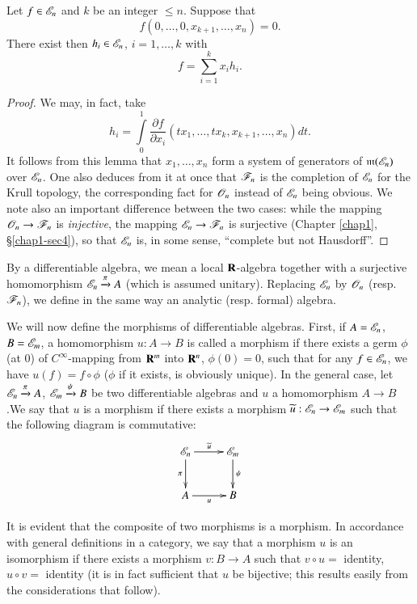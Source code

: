 \begin{lemma}\label{chap3-lem2.1}
Let $f\in \mathscr{E}_{n}$ and $k$ be an integer $\leq n$. Suppose that 
$$
f(0,\ldots,0,x_{k+1},\ldots,x_{n})=0.
$$
There exist then $h_{i}\in \mathscr{E}_{n}$, $i=1,\ldots,k$ with
$$
f=\sum\limits^{k}_{i=1}x_{i}h_{i}.
$$
\end{lemma}

\begin{proof}
We may, in fact, take
$$
h_{i}=\int\limits^{1}_{0}\dfrac{\partial f}{\partial x_{i}}(tx_{1},\ldots,tx_{k},x_{k+1},\ldots,x_{n})dt.
$$
It follows from this lemma that $x_{1},\ldots,x_{n}$ form a system of generators of $\mathfrak{m}(\mathscr{E}_{n})$ over $\mathscr{E}_{n}$. One also deduces from it at once that $\mathscr{F}_{n}$ is the completion of $\mathscr{E}_{n}$ for the Krull topology, the corresponding fact for $\mathscr{O}_{n}$ instead of $\mathscr{E}_{n}$ being obvious. We note also an important difference between the two cases: while the mapping $\mathscr{O}_{n}\to \mathscr{F}_{n}$ is {\em injective}, the mapping $\mathscr{E}_{n}\to \mathscr{F}_{n}$ is surjective (Chapter \ref{chap1}, \S\ref{chap1-sec4}), so that $\mathscr{E}_{n}$ is, in some sense, ``complete but not Hausdorff''.
\end{proof}

\begin{definition}\label{chap3-defi2.2}
By a differentiable algebra, we mean a local $\mathbf{R}$-algebra together with a surjective homomorphism $\mathscr{E}_{n}\xrightarrow{\pi}A$ (which is assumed unitary). Replacing $\mathscr{E}_{n}$ by $\mathscr{O}_{n}$ (resp. $\mathscr{F}_{n}$), we define in the same way an analytic (resp. formal) algebra.
\end{definition}

We will now define the morphisms of differentiable algebras. First, if $A=\mathscr{E}_{n}$, $B=\mathscr{E}_{m}$, a homomorphism $u:A\to B$ is called a morphism if there exists a germ $\phi$ (at 0) of $C^{\infty}$-mapping from $\mathbf{R}^{m}$ into $\mathbf{R}^{n}$, $\phi(0)=0$, such that for any $f\in \mathscr{E}_{n}$, we have $u(f)=f\circ \phi$ ($\phi$ if it exists, is obviously unique). In the general case, let $\mathscr{E}_{n}\xrightarrow{\pi}A$, $\mathscr{E}_{m}\xrightarrow{\psi}B$ be two differentiable algebras and $u$ a homomorphism $A\to B$.\pageoriginale We say that $u$ is a morphism if there exists a morphism $\widetilde{u}:\mathscr{E}_{n}\to \mathscr{E}_{m}$ such that the following diagram is commutative:
\[
\xymatrix@=.9cm{
\scrE_{n}\ar[d]_{\pi}\ar[r]^{\widetilde{u}} & \scrE_{m}\ar[d]^{\psi}\\
A\ar[r]_{u} & B
}
\]

It is evident that the composite of two morphisms is a morphism. In accordance with general definitions in a category, we say that a morphism $u$ is an isomorphism if there exists a morphism $v:B\to A$ such that $v\circ u=$ identity, $u\circ v=$ identity (it is in fact sufficient that $u$ be bijective; this results easily from the considerations that follow).

